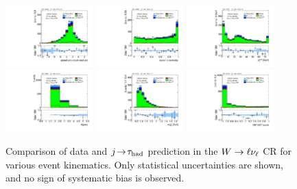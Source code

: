 \begin{figure}[tp]
  \includegraphics[width=0.30\textwidth]{figures/analysis/vbf-WlvCR/jets-etaprod}
  \includegraphics[width=0.30\textwidth]{figures/analysis/vbf-WlvCR/lep-eta-centrality}
  \includegraphics[width=0.30\textwidth]{figures/analysis/vbf-WlvCR/system-pt} \\
  \includegraphics[width=0.30\textwidth]{figures/analysis/vbf-WlvCR/n-jets30}
  \includegraphics[width=0.30\textwidth]{figures/analysis/vbf-WlvCR/dijet-m-veryhigh}
  \includegraphics[width=0.30\textwidth]{figures/analysis/vbf-WlvCR/BDTEve-VBF} \\
  \caption{Comparison of data and $j\!\rightarrow\!\tau_\text{had}$ prediction in the $W \rightarrow \ell\nu_\ell$ CR for various event kinematics. Only statistical uncertainties are shown, and no sign of systematic bias is observed.}
  \label{fig:backgrounds-WlvCR-jets}
\end{figure}

